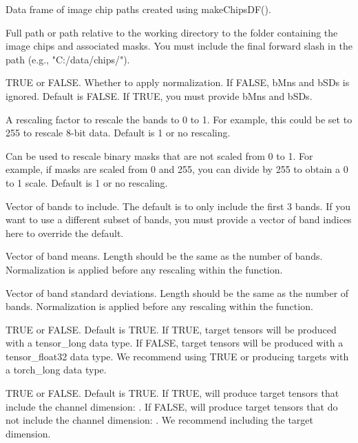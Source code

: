 \documentclass[a4paper]{book}
\begin{document}
\begin{Arguments}
\begin{ldescription}
\item[\code{chpDF}] Data frame of image chip paths created using makeChipsDF().

\item[\code{folder}] Full path or path relative to the working directory to the
folder containing the image chips and associated masks. You must include the
final forward slash in the path (e.g., "C:/data/chips/").

\item[\code{normalize}] TRUE or FALSE. Whether to apply normalization. If FALSE,
bMns and bSDs is ignored. Default is FALSE. If TRUE, you must provide bMns
and bSDs.

\item[\code{rescaleFactor}] A rescaling factor to rescale the bands to 0 to 1. For
example, this could be set to 255 to rescale 8-bit data. Default is 1 or no
rescaling.

\item[\code{mskRescale}] Can be used to rescale binary masks that are not scaled from
0 to 1. For example, if masks are scaled from 0 and 255, you can divide by 255 to
obtain a 0 to 1 scale. Default is 1 or no rescaling.

\item[\code{bands}] Vector of bands to include. The default is to only include the
first 3 bands. If you want to use a different subset of bands, you must provide
a vector of band indices here to override the default.

\item[\code{bMns}] Vector of band means. Length should be the same as the number of bands.
Normalization is applied before any rescaling within the function.

\item[\code{bSDs}] Vector of band standard deviations. Length should be the same
as the number of bands. Normalization is applied before any rescaling within
the function.

\item[\code{mskLong}] TRUE or FALSE. Default is TRUE. If TRUE, target tensors will be produced with a
tensor\_long data type. If FALSE, target tensors will be produced with a tensor\_float32 data type.
We recommend using TRUE or producing targets with a torch\_long data type.

\item[\code{chnDim}] TRUE or FALSE. Default is TRUE. If TRUE, will produce target tensors that include the
channel dimension: . If FALSE, will produce target tensors that do not include the
channel dimension: . We recommend including the target dimension.


\end{ldescription}
\end{Arguments}
\end{document}
